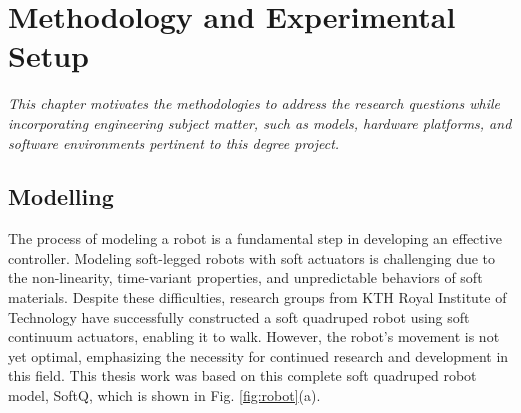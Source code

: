 \chapter{Methodology and Experimental Setup}
\label{chap3}
\textit{This chapter motivates the methodologies to address the research questions while incorporating engineering subject matter, such as models, hardware platforms, and software environments pertinent to this degree project.} 

\section{Modelling}
The process of modeling a robot is a fundamental step in developing an effective controller. Modeling soft-legged robots with soft actuators is challenging due to the non-linearity, time-variant properties, and unpredictable behaviors of soft materials. Despite these difficulties, research groups from KTH Royal Institute of Technology\cite{ji2022Synthesizing, danelia2021Structure, thorapallimuralidharan2020Continuum, ji2022Learningbased} have successfully constructed a soft quadruped robot using soft continuum actuators, enabling it to walk. However, the robot's movement is not yet optimal, emphasizing the necessity for continued research and development in this field. This thesis work was based on this complete soft quadruped robot model, SoftQ, which is shown in Fig. \ref{fig:robot}(a). 

